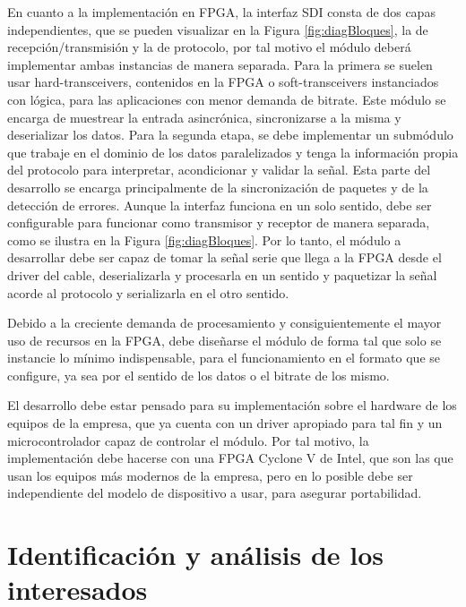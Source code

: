 \documentclass[11pt]{charter}
\begin{document}
\vspace{25px}

En cuanto a la implementación en FPGA, la interfaz SDI consta de dos capas independientes, que se pueden visualizar en la Figura \ref{fig:diagBloques}, la de recepción/transmisión y la de protocolo, por tal motivo el módulo deberá implementar ambas instancias de manera separada. Para la primera se suelen usar hard-transceivers, contenidos en la FPGA o soft-transceivers instanciados con lógica, para las aplicaciones con menor demanda de bitrate. Este módulo se encarga de muestrear la entrada asincrónica, sincronizarse a la misma y deserializar los datos. Para la segunda etapa, se debe implementar un submódulo que trabaje en el dominio de los datos paralelizados y tenga la información propia del protocolo para interpretar, acondicionar y validar la señal. Esta parte del desarrollo se encarga principalmente de la sincronización de paquetes y de la detección de errores.
Aunque la interfaz funciona en un solo sentido, debe ser configurable para funcionar como transmisor y receptor de manera separada, como se ilustra en la Figura \ref{fig:diagBloques}. Por lo tanto, el módulo a desarrollar debe ser capaz de tomar la señal serie que llega a la FPGA desde el driver del cable, deserializarla y procesarla en un sentido y paquetizar la señal acorde al protocolo y serializarla en el otro sentido.

Debido a la creciente demanda de procesamiento y consiguientemente el mayor uso de recursos en la FPGA, debe diseñarse el módulo de forma tal que solo se instancie lo mínimo indispensable, para el funcionamiento en el formato que se configure, ya sea por el sentido de los datos o el bitrate de los mismo.

El desarrollo debe estar pensado para su implementación sobre el hardware de los equipos de la empresa, que ya cuenta con un driver apropiado para tal fin y un microcontrolador capaz de controlar el módulo. Por tal motivo, la implementación debe hacerse con una FPGA Cyclone V de Intel, que son las que usan los equipos más modernos de la empresa, pero en lo posible debe ser independiente del modelo de dispositivo a usar, para asegurar portabilidad.

\section{Identificación y análisis de los interesados}
\label{sec:interesados}
\end{document}
